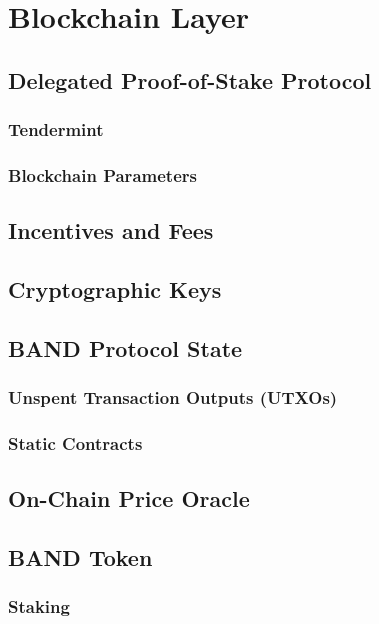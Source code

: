 \documentclass[letterpaper,11pt]{article}
\begin{document}
\section{Blockchain Layer}

\subsection{Delegated Proof-of-Stake Protocol}

\subsubsection{Tendermint}

\subsubsection{Blockchain Parameters}

\subsection{Incentives and Fees}

\subsection{Cryptographic Keys}

\subsection{BAND Protocol State}

\subsubsection{Unspent Transaction Outputs (UTXOs)}

\subsubsection{Static Contracts}

\subsection{On-Chain Price Oracle}

\subsection{BAND Token}

\subsubsection{Staking}
\end{document}
